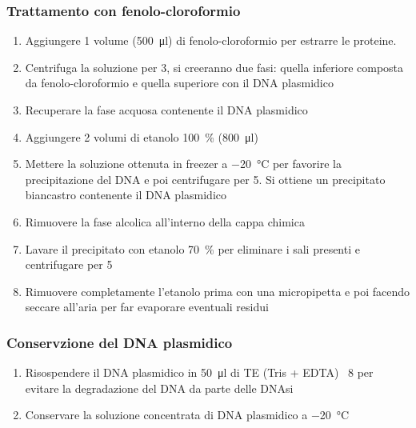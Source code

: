 \subsubsection{Trattamento con fenolo-cloroformio}
\begin{enumerate}
	\item  Aggiungere 1 volume (\qty{500}{\micro\litre}) di fenolo-cloroformio per estrarre le proteine.  
	\item  Centrifuga la soluzione per \qty{3}{\min}, si creeranno due fasi: quella inferiore composta da fenolo-cloroformio e quella superiore con il DNA plasmidico
	\item  Recuperare la fase acquosa contenente il DNA plasmidico
	\item  Aggiungere 2 volumi di etanolo \qty{100}{\percent} (\qty{800}{\micro\litre})
	\item  Mettere la soluzione ottenuta in freezer a \qty{-20}{\celsius} per favorire la precipitazione del DNA e poi centrifugare per \qty{5}{\min}. Si ottiene un precipitato biancastro contenente il DNA plasmidico
	\item  Rimuovere la fase alcolica all’interno della cappa chimica
	\item Lavare il precipitato con etanolo \qty{70}{\percent} per eliminare i sali presenti e centrifugare per \qty{5}{\min}
	\item  Rimuovere completamente l’etanolo prima con una micropipetta e poi facendo seccare all’aria per far evaporare eventuali residui
\end{enumerate}

\subsubsection{Conservzione del DNA plasmidico}
\begin{enumerate}
	\item  Risospendere il DNA plasmidico in \qty{50}{\micro\litre} di TE (Tris + EDTA) \pH\ 8 per evitare la degradazione del DNA da parte delle DNAsi
	\item  Conservare la soluzione concentrata di DNA plasmidico a \qty{-20}{\celsius}
\end{enumerate}